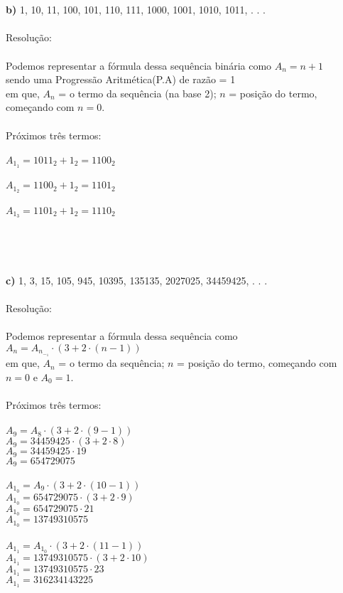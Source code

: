\documentclass[a4paper,12pt]{article}
\begin{document}
\begin{itemize}
     \\\\
     \newpage
     \textbf{b)} 1, 10, 11, 100, 101, 110, 111, 1000, 1001, 1010, 1011, . . .
     \\\\Resolução:
     \\\\Podemos representar a fórmula dessa sequência binária como $A_n=n+1$
     \\sendo uma Progressão Aritmética(P.A) de razão = 1
     \\em que, $A_n$ = o termo da sequência (na base 2); $n$ = posição do termo, começando com $n=0$.
     \\\\Próximos três termos:
     \\\\$A_1_1=1011_2+1_2 = 1100_2$
     \\\\$A_1_2=1100_2+1_2 = 1101_2$
     \\\\$A_1_3=1101_2+1_2 = 1110_2$
     \\
     
     \\\\
     \\\\\textbf{c)} 1, 3, 15, 105, 945, 10395, 135135, 2027025, 34459425, . . .
     \\\\Resolução:
    \\\\Podemos representar a fórmula dessa sequência como $A_n=A_n_-_1\cdot (3+2\cdot (n-1))$
    \\em que, $A_n$ = o termo da sequência; $n$ = posição do termo, começando com $n=0$ e $A_0=1$.
     \\\\Próximos três termos:
     \\\\$A_9=A_8\cdot (3+2\cdot (9-1))$
     \\$A_9=34459425\cdot (3+2\cdot 8)$
     \\$A_9=34459425\cdot 19$
     \\$A_9=654729075$
     \\\\$A_1_0=A_9\cdot (3+2\cdot (10-1))$
     \\$A_1_0=654729075\cdot (3+2\cdot 9)$
     \\$A_1_0=654729075\cdot 21$
     \\$A_1_0=13749310575$
     \\\\$A_1_1=A_1_0\cdot (3+2\cdot (11-1))$
     \\$A_1_1=13749310575\cdot (3+2\cdot 10)$
     \\$A_1_1=13749310575\cdot 23$
     \\$A_1_1=316234143225$
     \\
     

\end{itemize}
\end{document}
